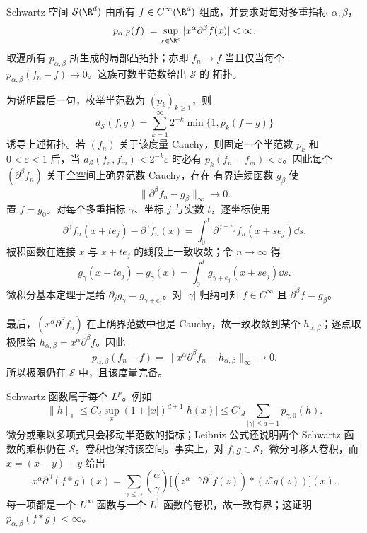 \begin{definition}[Schwartz 空间]\label{def:7-2-3-1}
Schwartz 空间 $\mathcal S(\R^d)$ 由所有 $f\in C^\infty(\R^d)$ 组成，并要求对每对多重指标
$\alpha,\beta$，
\[
 p_{\alpha,\beta}(f)
 :=\sup_{x\in\R^d}|x^\alpha\partial^\beta f(x)|<\infty.
\]
取遍所有 $p_{\alpha,\beta}$ 所生成的局部凸拓扑；亦即
$f_n\to f$ 当且仅当每个 $p_{\alpha,\beta}(f_n-f)\to0$。这族可数半范数给出
$\mathcal S$ 的 \Frechet{} 拓扑。
\end{definition}

为说明最后一句，枚举半范数为 $(p_k)_{k\geq1}$，则
\[
 d_{\mathcal S}(f,g)=\sum_{k=1}^\infty2^{-k}
   \min\{1,p_k(f-g)\}
\]
诱导上述拓扑。若 $(f_n)$ 关于该度量 Cauchy，则固定一个半范数 $p_k$ 和
$0<\varepsilon<1$ 后，当
$d_{\mathcal S}(f_n,f_m)<2^{-k}\varepsilon$ 时必有
$p_k(f_n-f_m)<\varepsilon$。因此每个 $(\partial^\beta f_n)$ 关于全空间上确界范数 Cauchy，存在
有界连续函数 $g_\beta$ 使
\[
 \|\partial^\beta f_n-g_\beta\|_\infty\longrightarrow0.
\]
置 $f=g_0$。对每个多重指标 $\gamma$、坐标 $j$ 与实数 $t$，逐坐标使用
\[
 \partial^\gamma f_n(x+te_j)-\partial^\gamma f_n(x)
 =\int_0^t\partial^{\gamma+e_j}f_n(x+se_j)\dd s.
\]
被积函数在连接 $x$ 与 $x+te_j$ 的线段上一致收敛；令 $n\to\infty$ 得
\[
 g_\gamma(x+te_j)-g_\gamma(x)
 =\int_0^tg_{\gamma+e_j}(x+se_j)\dd s.
\]
微积分基本定理于是给 $\partial_jg_\gamma=g_{\gamma+e_j}$。对 $|\gamma|$ 归纳可知
$f\in C^\infty$ 且 $\partial^\beta f=g_\beta$。

最后，$(x^\alpha\partial^\beta f_n)$ 在上确界范数中也是 Cauchy，故一致收敛到某个
$h_{\alpha,\beta}$；逐点取极限给
$h_{\alpha,\beta}=x^\alpha\partial^\beta f$。因此
\[
 p_{\alpha,\beta}(f_n-f)
 =\|x^\alpha\partial^\beta f_n-h_{\alpha,\beta}\|_\infty
 \longrightarrow0.
\]
所以极限仍在 $\mathcal S$ 中，且该度量完备。

Schwartz 函数属于每个 $L^p$。例如
\begin{equation}\label{eq:7-2-schwartz-l1-bound}
 \|h\|_1
 \leq C_d\sup_x(1+|x|)^{d+1}|h(x)|
 \leq C'_d\sum_{|\gamma|\leq d+1}p_{\gamma,0}(h).
\end{equation}
微分或乘以多项式只会移动半范数的指标；Leibniz 公式还说明两个 Schwartz 函数的乘积仍在
$\mathcal S$。卷积也保持该空间。事实上，对 $f,g\in\mathcal S$，微分可移入卷积，而
$x=(x-y)+y$ 给出
\[
 x^\alpha\partial^\beta(f*g)(x)
 =\sum_{\gamma\leq\alpha}\binom{\alpha}{\gamma}
 \bigl[(z^{\alpha-\gamma}\partial^\beta f(z))
       *(z^\gamma g(z))\bigr](x).
\]
每一项都是一个 $L^\infty$ 函数与一个 $L^1$ 函数的卷积，故一致有界；这证明
$p_{\alpha,\beta}(f*g)<\infty$。

